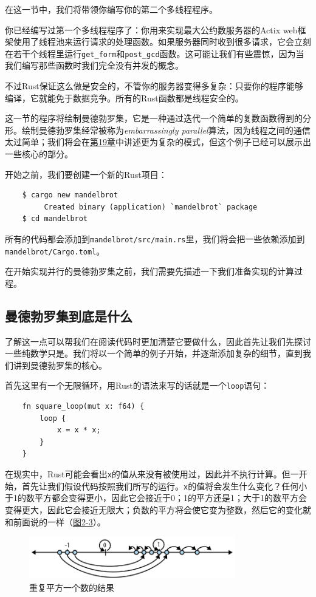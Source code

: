 在这一节中，我们将带领你编写你的第二个多线程程序。

你已经编写过第一个多线程程序了：你用来实现最大公约数服务器的Actix web框架使用了线程池来运行请求的处理函数。如果服务器同时收到很多请求，它会立刻在若干个线程里运行\texttt{get\_form}和\texttt{post\_gcd}函数。这可能让我们有些震惊，因为当我们编写那些函数时我们完全没有并发的概念。

不过Rust保证这么做是安全的，不管你的服务器变得多复杂：只要你的程序能够编译，它就能免于数据竞争。所有的Rust函数都是线程安全的。

这一节的程序将绘制曼德勃罗集，它是一种通过迭代一个简单的复数函数得到的分形。绘制曼德勃罗集经常被称为\emph{embarrassingly parallel}算法，因为线程之间的通信太过简单；我们将会在\hyperref[ch19]{第19章}中讲述更为复杂的模式，但这个例子已经可以展示出一些核心的部分。

开始之前，我们要创建一个新的Rust项目：
\begin{verbatim}
    $ cargo new mandelbrot
         Created binary (application) `mandelbrot` package
    $ cd mandelbrot
\end{verbatim}

所有的代码都会添加到\texttt{mandelbrot/src/main.rs}里，我们将会把一些依赖添加到\texttt{mandelbrot/Cargo.toml}。

在开始实现并行的曼德勃罗集之前，我们需要先描述一下我们准备实现的计算过程。

\subsection{曼德勃罗集到底是什么}
了解这一点可以帮我们在阅读代码时更加清楚它要做什么，因此首先让我们先探讨一些纯数学只是。我们将以一个简单的例子开始，并逐渐添加复杂的细节，直到我们讲到曼德勃罗集的核心。

首先这里有一个无限循环，用Rust的语法来写的话就是一个\texttt{loop}语句：
\begin{verbatim}
    fn square_loop(mut x: f64) {
        loop {
            x = x * x;
        }
    }
\end{verbatim}

在现实中，Rust可能会看出\texttt{x}的值从来没有被使用过，因此并不执行计算。但一开始，首先让我们假设代码按照我们所写的运行。\texttt{x}的值将会发生什么变化？任何小于1的数平方都会变得更小，因此它会接近于0；1的平方还是1；大于1的数平方会变得更大，因此它会接近无限大；负数的平方将会使它变为整数，然后它的变化就和前面说的一样（\hyperref[f2-3]{图2-3}）。
\begin{figure}[htbp]
    \centering
    \includegraphics[width=0.8\textwidth]{../img/f2-3.png}
    \caption{重复平方一个数的结果}
    \label{f2-3}
\end{figure}

